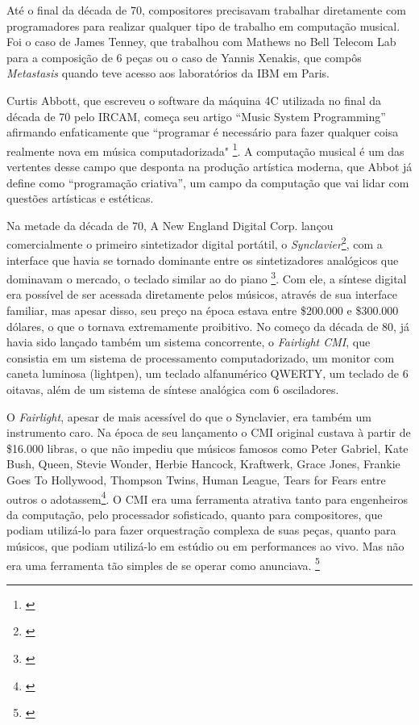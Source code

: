 Até o final da década de 70, compositores precisavam trabalhar diretamente com programadores para realizar qualquer tipo de trabalho em computação musical. Foi o caso de James Tenney, que trabalhou com Mathews no Bell Telecom Lab para a composição de 6 peças ou o caso de Yannis Xenakis, que compôs \emph{Metastasis} quando teve acesso aos laboratórios da IBM em Paris\cite{Holmes1985}. 



Curtis Abbott, que escreveu o software da máquina 4C utilizada no final da década de 70 pelo IRCAM, começa seu artigo ``Music System Programming'' afirmando enfaticamente que ``programar é necessário para fazer qualquer coisa realmente nova em música computadorizada" \footnote{\cite[51]{Roads1996}}. A computação musical é um das vertentes desse campo que desponta na produção artística moderna, que Abbot já define como ``programação criativa'', um campo da computação que vai lidar com questões artísticas e estéticas. 

Na metade da década de 70, A New England Digital Corp. lançou comercialmente o primeiro sintetizador digital portátil, o \emph{Synclavier}\footnote{\cite[265]{Holmes1985}}, com a interface que havia se tornado dominante entre os sintetizadores analógicos que dominavam o mercado, o teclado similar ao do piano \footnote{\cite{JosephParadiso1998}}. Com ele, a síntese digital era possível de ser acessada diretamente pelos músicos, através de sua interface familiar, mas apesar disso, seu preço na época estava entre \$200.000 e \$300.000 dólares, o que o tornava extremamente proibitivo. No começo da década de 80, já havia sido lançado também um sistema concorrente, o \emph{Fairlight CMI}, que consistia em um sistema de processamento computadorizado, um monitor com caneta luminosa (lightpen), um teclado alfanumérico QWERTY, um teclado de 6 oitavas, além de um sistema de síntese analógica com 6 osciladores.

O \emph{Fairlight}, apesar de mais acessível do que o Synclavier, era também um instrumento caro. Na época de seu lançamento o CMI original custava à partir de \$16.000 libras, o que não impediu que músicos famosos como Peter Gabriel, Kate Bush, Queen, Stevie Wonder, Herbie Hancock, Kraftwerk, Grace Jones, Frankie Goes To Hollywood, Thompson Twins, Human League, Tears for Fears entre outros o adotassem\footnote{\cite[18]{Twyman2004}}. O CMI era uma ferramenta atrativa tanto para engenheiros da computação, pelo processador sofisticado, quanto para compositores, que podiam utilizá-lo para fazer orquestração complexa de suas peças, quanto para músicos, que podiam utilizá-lo em estúdio ou em performances ao vivo. Mas não era uma ferramenta tão simples de se operar como anunciava. \footnote{\cite[55]{Twyman2004}}

